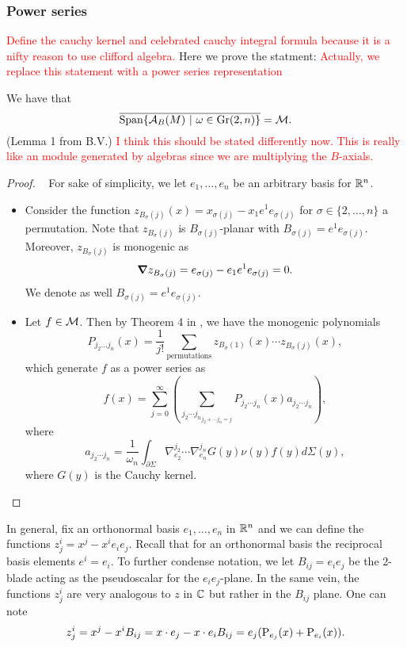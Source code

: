 \subsubsection{Power series}
\textcolor{red}{Define the cauchy kernel and celebrated cauchy integral formula because it is a nifty reason to use clifford algebra.}
Here we prove the statment: \textcolor{red}{Actually, we replace this statement with a power series representation}
\begin{lemma}
We have that
\[
\overline{\operatorname{Span} \{ \mathcal{A}_{B}(M) ~\vert~ \omega \in \operatorname{Gr}(2,n) \}} = \mathcal{M}.
\]
(Lemma 1 from B.V.) \textcolor{red}{I think this should be stated differently now. This is really like an module generated by algebras since we are multiplying the $B$-axials.}
\end{lemma}
\begin{proof}~
For sake of simplicity, we let $e_1,\dots, e_n$ be an arbitrary basis for $\mathbb{R}^n$.  
\begin{itemize}
    \item Consider the function $z_{B_\sigma(j)}(x)=x_{\sigma(j)} - x_1 e^1 e_{\sigma(j)}$ for $\sigma \in \{2,\dots,n\}$ a permutation.  Note that $z_{B_\sigma(j)}$ is $B_{\sigma(j)}$-planar with $B_{\sigma(j)}=e^1 e_{\sigma(j)}$.  Moreover, $z_{B_\sigma(j)}$ is monogenic as
    \[
        \boldsymbol{\nabla} z_{B_\sigma(j)} = e_{\sigma(j)} - e_1 e^1 e_{\sigma(j)} = 0.
    \]
    We denote as well $B_{\sigma(j)} = e^1 e_{\sigma(j)}$.
    \item Let $f \in \mathcal{M}$.  Then by Theorem 4 in \cite{ryan_left_1986}, we have the monogenic polynomials
    \[
        P_{j_2 \dots j_n}(x) = \frac{1}{j!} \sum_{\textrm{permutations}}z_{B_\sigma(1)}(x) \cdots z_{B_\sigma(j)}(x),
    \]
    which generate $f$ as a power series as
    \[
        f(x) = \sum_{j=0}^\infty \left(\sum_{{j_2 \cdots j_n}_{j_2 + \cdots j_n = j}} P_{j_2 \cdots j_n} (x) a_{j_2 \cdots j_n}\right),
    \]
    where
    \[
        a_{j_2 \cdots j_n} = \frac{1}{\omega_n} \int_{\partial \Sigma} \nabla_{e_2}^{j_2} \cdots \nabla_{e_n}^{j_n} G(y) \nu(y) f(y) d \Sigma(y),
    \]
    where $G(y)$ is the Cauchy kernel.
\end{itemize}
\end{proof}

In general, fix an orthonormal basis $e_1,\dots,e_n$ in $\mathbb{R}^n$ and we can define the functions $z_j^i = x^j - x^i e_i e_j$. Recall that for an orthonormal basis the reciprocal basis elements $e^i=e_i$. To further condense notation, we let $B_{ij}=e_i e_j$ be the 2-blade acting as the pseudoscalar for the $e_i e_j$-plane. In the same vein, the functions $z_j^i$ are very analogous to $z$ in $\mathbb{C}$ but rather in the $B_{ij}$ plane.  One can note
\[
z_j^i = x^j - x^i B_{ij} = x \cdot e_j - x\cdot e_i B_{ij} = e_j(\operatorname{P}_{e_j}(x) + \operatorname{P}_{e_i}(x)).
\]





